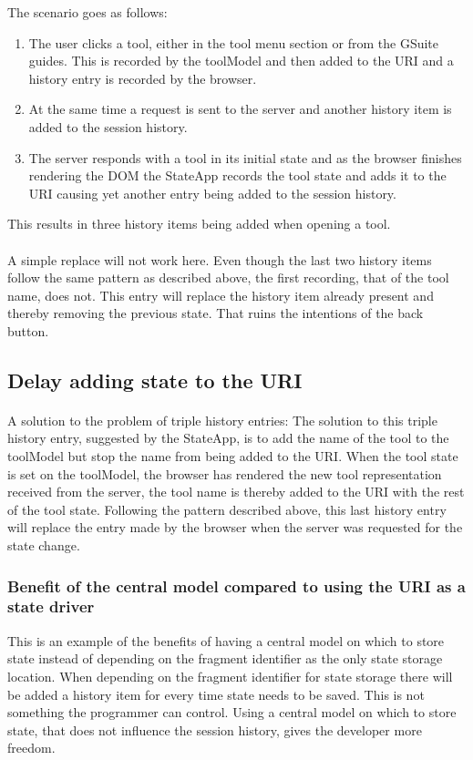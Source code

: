 \documentclass[english]{ifimaster}
\begin{document}
The scenario goes as follows: 
\begin{enumerate}
\item The user clicks a tool, either in the tool menu section or from the GSuite guides. This is recorded by the toolModel and then added to the URI and a history entry is recorded by the browser. \item At the same time a request is sent to the server and another history item is added to the session history. 
\item The server responds with a tool in its initial state and as the browser finishes rendering the DOM the StateApp records the tool state and adds it to the URI causing yet another entry being added to the session history.  
\end{enumerate}

This results in three history items being added when opening a tool.

\paragraph{} A simple replace will not work here. Even though the last two history items follow the same pattern as described above, the first recording, that of the tool name, does not. This entry will replace the history item already present and thereby removing the previous state. That ruins the intentions of the back button. 

\subsection{Delay adding state to the URI}
\label{sec:delayAddingToURI}
\paragraph{}A solution to the problem of triple history entries:
The solution to this triple history entry, suggested by the StateApp, is to add the name of the tool to the toolModel but stop the name from being added to the URI. When the tool state is set on the toolModel, the browser has rendered the new tool representation received from the server, the tool name is thereby added to the URI with the rest of the tool state. Following the pattern described above, this last history entry will replace the entry made by the browser when the server was requested for the state change. 

\subsubsection{Benefit of the central model compared to using the URI as a state driver}
This is an example of the benefits of having a central model on which to store state instead of depending on the fragment identifier as the only state storage location. When depending on the fragment identifier for state storage there will be added a history item for every time state needs to be saved. This is not something the programmer can control. Using a central model on which to store state, that does not influence the session history, gives the developer more freedom. 
\end{document}
